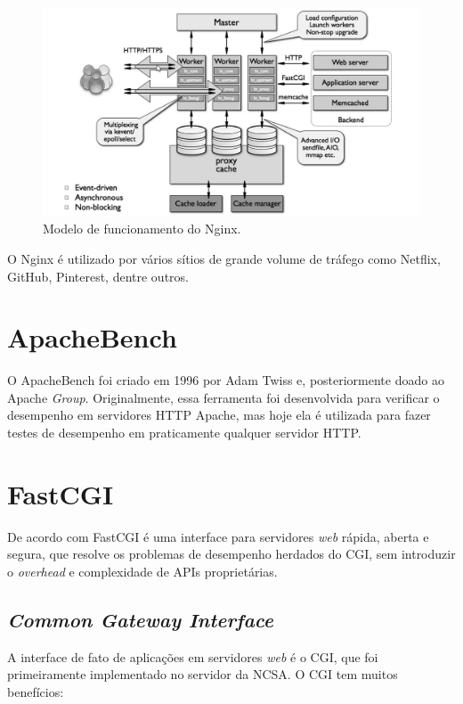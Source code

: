 \begin{figure}[h!]
\centering
\includegraphics[scale=1]{figuras/nginx-how-it-works} 
\caption{Modelo de funcionamento do Nginx.}
\label{fig:nginx-comofunciona}
\end{figure}

O Nginx é utilizado por vários sítios de grande volume de tráfego como Netflix, GitHub, Pinterest, dentre outros.\\

\section{ApacheBench}
O ApacheBench foi criado em 1996 por Adam Twiss e, posteriormente doado ao Apache \textit{Group}. Originalmente, essa ferramenta foi desenvolvida para verificar o desempenho em servidores HTTP Apache, mas hoje ela é utilizada para fazer testes de desempenho em  praticamente qualquer servidor HTTP.

\section{FastCGI}
De acordo com  FastCGI é uma interface para servidores \textit{web} rápida, aberta e segura, que resolve os problemas de desempenho herdados do CGI, sem introduzir o \textit{overhead} e complexidade de APIs proprietárias.

\subsection{\textit{Common Gateway Interface}}
A interface de fato de aplicações em servidores \textit{web} é o CGI, que foi primeiramente implementado no servidor da NCSA. O CGI tem muitos benefícios:

